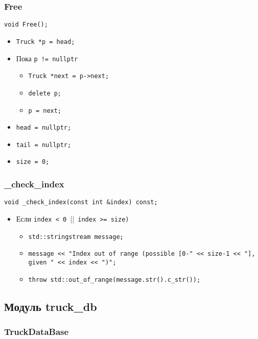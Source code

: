 \subsubsection*{Free}

\begin{lstlisting}
void Free();
\end{lstlisting}

\begin{itemize}
	\item \verb|Truck *p = head;|
	\item Пока \verb|p != nullptr|
	\begin{itemize}
		\item \verb|Truck *next = p->next;|
		\item \verb|delete p;|
		\item \verb|p = next;|
	\end{itemize}
	\item \verb|head = nullptr;|
	\item \verb|tail = nullptr;|
	\item \verb|size = 0;|
\end{itemize}

\subsubsection*{\_check\_index}

\begin{lstlisting}
void _check_index(const int &index) const;
\end{lstlisting}

\begin{itemize}
	\item Если \verb|index < 0 |||\verb| index >= size)|
	\begin{itemize}
		\item \verb|std::stringstream message;|
		\item \verb|message << "Index out of range (possible [0-" << size-1 << "], given " << index << ")";|
		\item \verb|throw std::out_of_range(message.str().c_str());|
	\end{itemize}
\end{itemize}

\subsection*{Модуль truck\_db}

\subsubsection*{TruckDataBase}

